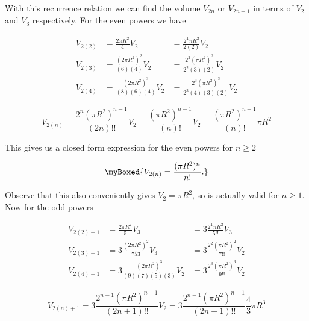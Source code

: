 {With this recurrence relation we can find the volume $V_{2n}$ or $V_{2n+1}$ in terms of $V_2$ and $V_3$ respectively.  For the even powers we have

\begin{equation}\label{eqn:basicStatMechProblemSet3Problem1:360}
\begin{array}{lll}
V_{2(2)} 
&= \frac{2 \pi R^2}{4} V_{2} 
&= \frac{2^1 \pi R^2}{2(2)} V_{2}  \\
V_{2(3)} 
&= \frac{(2 \pi R^2)^2}{(6)(4)} V_{2} 
&= \frac{2^2 (\pi R^2)^2}{2^2 (3)(2)} V_{2}  \\
V_{2(4)} 
&= \frac{(2 \pi R^2)^3}{(8)(6)(4)} V_{2} 
&= \frac{2^3 (\pi R^2)^3}{2^3 (4)(3)(2)} V_{2}  
\end{array}
\end{equation}

\begin{dmath}\label{eqn:basicStatMechProblemSet3Problem1:380}
V_{2(n)} 
= \frac{2^n (\pi R^2)^{n-1}}{(2n)!!} V_{2} 
= \frac{(\pi R^2)^{n-1}}{(n)!} V_{2} 
= \frac{(\pi R^2)^{n-1}}{(n)!} \pi R^2
\end{dmath}

This gives us a closed form expression for the even powers for $n \ge 2$

\begin{equation}\label{eqn:basicStatMechProblemSet3Problem1:400}
\myBoxed{
V_{2(n)} = \frac{(\pi R^2)^{n}}{n!}.
}
\end{equation}

Observe that this also conveniently gives $V_2 = \pi R^2$, so is actually valid for $n \ge 1$.  Now for the odd powers

\begin{equation}\label{eqn:basicStatMechProblemSet3Problem1:420}
\begin{array}{lll}
V_{2(2)+1} 
&= \frac{2 \pi R^2}{5} V_{3} 
&= 3 \frac{2^1 \pi R^2}{5!!} V_{3}  \\
V_{2(3)+1} 
&= 3 \frac{(2 \pi R^2)^2}{7 5 3} V_{3} 
&= 3 \frac{2^2 (\pi R^2)^2}{7!!} V_{2}  \\
V_{2(4)+1} 
&= 3 \frac{(2 \pi R^2)^3}{(9)(7)(5)(3)} V_{2} 
&= 3 \frac{2^3 (\pi R^2)^3}{9!!} V_{2}  
\end{array}
\end{equation}

\begin{dmath}\label{eqn:basicStatMechProblemSet3Problem1:440}
V_{2(n)+1} 
= 3 \frac{2^{n-1} (\pi R^2)^{n-1}}{(2n +1)!!} V_{2}  
= 3 \frac{2^{n-1} (\pi R^2)^{n-1}}{(2n +1)!!} \frac{4}{3} \pi R^3
\end{dmath}

}
